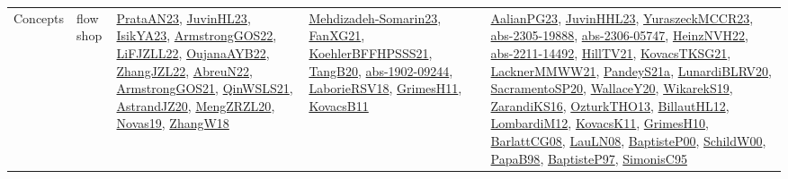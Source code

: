 {\begin{longtable}{llp{6cm}p{6cm}p{6cm}}
Concepts & flow shop & \href{articles/PrataAN23.pdf}{PrataAN23}\cite{PrataAN23}, \href{papers/JuvinHL23.pdf}{JuvinHL23}\cite{JuvinHL23}, \href{articles/IsikYA23.pdf}{IsikYA23}\cite{IsikYA23}, \href{papers/ArmstrongGOS22.pdf}{ArmstrongGOS22}\cite{ArmstrongGOS22}, \href{papers/LiFJZLL22.pdf}{LiFJZLL22}\cite{LiFJZLL22}, \href{papers/OujanaAYB22.pdf}{OujanaAYB22}\cite{OujanaAYB22}, \href{papers/ZhangJZL22.pdf}{ZhangJZL22}\cite{ZhangJZL22}, \href{articles/AbreuN22.pdf}{AbreuN22}\cite{AbreuN22}, \href{papers/ArmstrongGOS21.pdf}{ArmstrongGOS21}\cite{ArmstrongGOS21}, \href{articles/QinWSLS21.pdf}{QinWSLS21}\cite{QinWSLS21}, \href{articles/AstrandJZ20.pdf}{AstrandJZ20}\cite{AstrandJZ20}, \href{articles/MengZRZL20.pdf}{MengZRZL20}\cite{MengZRZL20}, \href{articles/Novas19.pdf}{Novas19}\cite{Novas19}, \href{articles/ZhangW18.pdf}{ZhangW18}\cite{ZhangW18} & \href{papers/Mehdizadeh-Somarin23.pdf}{Mehdizadeh-Somarin23}\cite{Mehdizadeh-Somarin23}, \href{articles/FanXG21.pdf}{FanXG21}\cite{FanXG21}, \href{articles/KoehlerBFFHPSSS21.pdf}{KoehlerBFFHPSSS21}\cite{KoehlerBFFHPSSS21}, \href{papers/TangB20.pdf}{TangB20}\cite{TangB20}, \href{articles/abs-1902-09244.pdf}{abs-1902-09244}\cite{abs-1902-09244}, \href{articles/LaborieRSV18.pdf}{LaborieRSV18}\cite{LaborieRSV18}, \href{papers/GrimesH11.pdf}{GrimesH11}\cite{GrimesH11}, \href{articles/KovacsB11.pdf}{KovacsB11}\cite{KovacsB11} & \href{papers/AalianPG23.pdf}{AalianPG23}\cite{AalianPG23}, \href{papers/JuvinHHL23.pdf}{JuvinHHL23}\cite{JuvinHHL23}, \href{articles/YuraszeckMCCR23.pdf}{YuraszeckMCCR23}\cite{YuraszeckMCCR23}, \href{articles/abs-2305-19888.pdf}{abs-2305-19888}\cite{abs-2305-19888}, \href{articles/abs-2306-05747.pdf}{abs-2306-05747}\cite{abs-2306-05747}, \href{articles/HeinzNVH22.pdf}{HeinzNVH22}\cite{HeinzNVH22}, \href{articles/abs-2211-14492.pdf}{abs-2211-14492}\cite{abs-2211-14492}, \href{papers/HillTV21.pdf}{HillTV21}\cite{HillTV21}, \href{papers/KovacsTKSG21.pdf}{KovacsTKSG21}\cite{KovacsTKSG21}, \href{papers/LacknerMMWW21.pdf}{LacknerMMWW21}\cite{LacknerMMWW21}, \href{articles/PandeyS21a.pdf}{PandeyS21a}\cite{PandeyS21a}, \href{articles/LunardiBLRV20.pdf}{LunardiBLRV20}\cite{LunardiBLRV20}, \href{articles/SacramentoSP20.pdf}{SacramentoSP20}\cite{SacramentoSP20}, \href{articles/WallaceY20.pdf}{WallaceY20}\cite{WallaceY20}, \href{articles/WikarekS19.pdf}{WikarekS19}\cite{WikarekS19}, \href{articles/ZarandiKS16.pdf}{ZarandiKS16}\cite{ZarandiKS16}, \href{articles/OzturkTHO13.pdf}{OzturkTHO13}\cite{OzturkTHO13}, \href{papers/BillautHL12.pdf}{BillautHL12}\cite{BillautHL12}, \href{articles/LombardiM12.pdf}{LombardiM12}\cite{LombardiM12}, \href{articles/KovacsK11.pdf}{KovacsK11}\cite{KovacsK11}, \href{papers/GrimesH10.pdf}{GrimesH10}\cite{GrimesH10}, \href{papers/BarlattCG08.pdf}{BarlattCG08}\cite{BarlattCG08}, \href{papers/LauLN08.pdf}{LauLN08}\cite{LauLN08}, \href{articles/BaptisteP00.pdf}{BaptisteP00}\cite{BaptisteP00}, \href{articles/SchildW00.pdf}{SchildW00}\cite{SchildW00}, \href{articles/PapaB98.pdf}{PapaB98}\cite{PapaB98}, \href{papers/BaptisteP97.pdf}{BaptisteP97}\cite{BaptisteP97}, \href{papers/SimonisC95.pdf}{SimonisC95}\cite{SimonisC95}\\

\end{longtable}}
